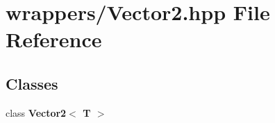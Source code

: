 \section{wrappers/\+Vector2.hpp File Reference}
\label{_vector2_8hpp}
\subsection*{Classes}
\begin{DoxyCompactItemize}
\item 
class \textbf{ Vector2$<$ T $>$}
\end{DoxyCompactItemize}
